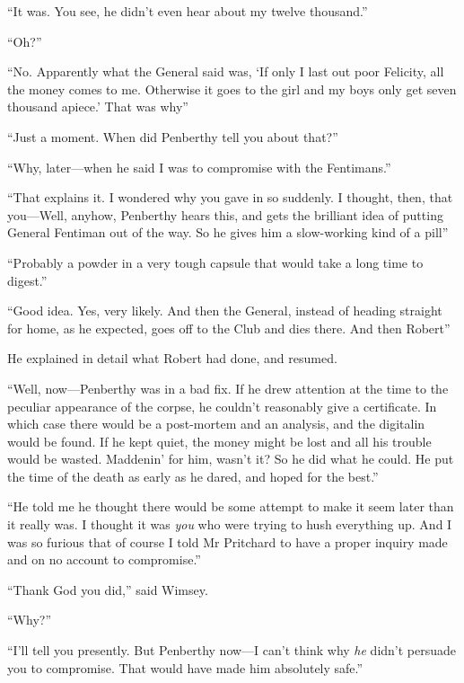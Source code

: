 \enquote{It was. You see, he didn't even hear about my twelve thousand.}

\enquote{Oh?}

\enquote{No. Apparently what the General said was, \enquote{If only I last out poor Felicity, all the money comes to me. Otherwise it goes to the girl and my boys only get seven thousand apiece.} That was why\longdash}

\enquote{Just a moment. When did Penberthy tell you about that?}

\enquote{Why, later\allowbreak---\allowbreak when he said I was to compromise with the Fentimans.}

\enquote{That explains it. I wondered why you gave in so suddenly. I thought, then, that you\allowbreak---\allowbreak Well, anyhow, Penberthy hears this, and gets the brilliant idea of putting General Fentiman out of the way. So he gives him a slow-working kind of a pill\longdash}

\enquote{Probably a powder in a very tough capsule that would take a long time to digest.}

\enquote{Good idea. Yes, very likely. And then the General, instead of heading straight for home, as he expected, goes off to the Club and dies there. And then Robert\longdash}

He explained in detail what Robert had done, and resumed.

\enquote{Well, now\allowbreak---\allowbreak Penberthy was in a bad fix. If he drew attention at the time to the peculiar appearance of the corpse, he couldn't reasonably give a certificate. In which case there would be a post-mortem and an analysis, and the digitalin would be found. If he kept quiet, the money might be lost and all his trouble would be wasted. Maddenin' for him, wasn't it? So he did what he could. He put the time of the death as early as he dared, and hoped for the best.}

\enquote{He told me he thought there would be some attempt to make it seem later than it really was. I thought it was \textit{you} who were trying to hush everything up. And I was so furious that of course I told Mr Pritchard to have a proper inquiry made and on no account to compromise.}

\enquote{Thank God you did,} said Wimsey.

\enquote{Why?}

\enquote{I'll tell you presently. But Penberthy now\allowbreak---\allowbreak I can't think why \textit{he} didn't persuade you to compromise. That would have made him absolutely safe.}

